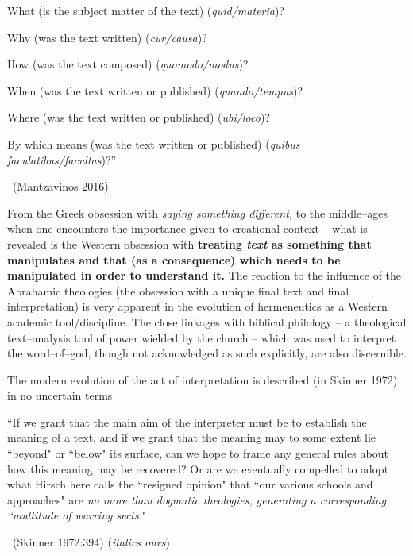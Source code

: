  \item What (is the subject matter of the text) (\textit{quid/materia})?

 \item Why (was the text written) (\textit{cur/causa})?

 \item How (was the text composed) (\textit{quomodo/modus})?

 \item When (was the text written or published) (\textit{quando/tempus})?

 \item Where (was the text written or published) (\textit{ubi/loco})?

 \item By which means (was the text written or published) (\textit{quibus faculatibus/facultas})?” 

~\hfill (Mantzavinos 2016)

From the Greek obsession with \textit{saying something different,} to the middle–ages when one encounters the importance given to creational context – what is revealed is the Western obsession with \textbf{treating \textit{text} as something that manipulates and that (as a consequence) which needs to be manipulated in order to understand it.} The reaction to the influence of the Abrahamic theologies (the obsession with a unique final text and final interpretation) is very apparent in the evolution of hermeneutics as a Western academic tool/discipline. The close linkages with biblical philology – a theological text–analysis tool of power wielded by the church – which was used to interpret the word–of–god, though not acknowledged as such explicitly, are also discernible.

The modern evolution of the act of interpretation is described (in Skinner 1972) in no uncertain terms

\begin{myquote}
“If we grant that the main aim of the interpreter must be to establish the meaning of a text, and if we grant that the meaning may to some extent lie “beyond" or “below" its surface, can we hope to frame any general rules about how this meaning may be recovered? Or are we eventually compelled to adopt what Hirsch here calls the “resigned opinion" that “our various schools and approaches" are \textit{no more than dogmatic theologies, generating a corresponding “multitude of warring sects}." 

~\hfill (Skinner 1972:394) (\textit{italics ours})
\end{myquote}

